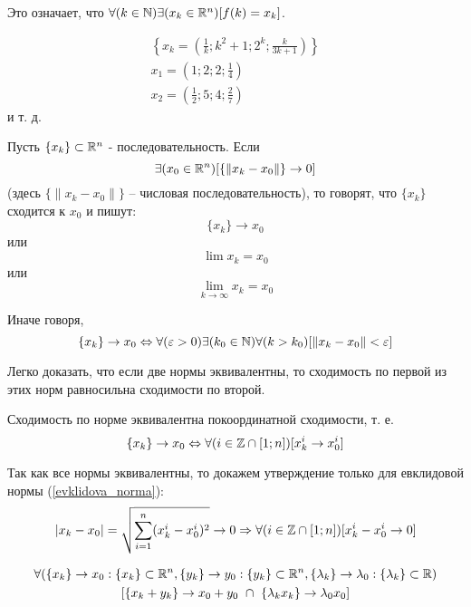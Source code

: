 Это означает, что $\forall(k\in\mathbb{N})\exists(x_k\in\mathbb{R}^n)[f(k)=x_k]$.

\begin{primer}
\begin{multline*}
\left\{x_k=\left( \frac{1}{k};k^2+1;2^k; \frac{k}{3k+1}\right)\right\}
\\
x_1=\left(1;2;2;\frac{1}{4}\right)
\\
x_2=\left(\frac{1}{2};5;4;\frac{2}{7}\right)
\end{multline*}
и т. д.
\end{primer}

\begin{opr}
Пусть $\{x_k\}\subset\mathbb{R}^n$ - последовательность.
Если $$\exists(x_0\in\mathbb{R}^n)[\{\|x_k-x_0\|\}\to0]$$ (здесь $\{\|x_k-x_0\|\}$ -- числовая последовательность), то говорят, что $\{x_k\}$ сходится к $x_0$ и пишут:
$$
\{x_k\}\to x_0
$$
или
$$
\lim x_k =  x_0
$$
или
$$
\lim_{k\to\infty} x_k =  x_0
$$
\end{opr}
Иначе говоря,
\begin{equation*}
\{x_k\}\to x_0 \Leftrightarrow \forall(\varepsilon>0)\exists(k_0\in\mathbb{N})\forall(k>k_0)[\|x_k-x_0\|<\varepsilon]
\end{equation*}

Легко доказать, что если две нормы эквивалентны, то сходимость по первой из этих норм равносильна сходимости по второй.

\begin{teorema}
Сходимость по норме эквивалентна покоординатной сходимости, т. е.
$$
\{x_k\}\to x_0 \Leftrightarrow \forall(i\in\mathbb{Z}\cap[1;n])[x_k^i\to x_0^i]
$$
\end{teorema}
\dokvo
Так как все нормы эквивалентны, то докажем утверждение только для евклидовой нормы (\ref{evklidova_norma}):
$$|x_k-x_0|=\sqrt{\sum_{i=1}^{n}(x_k^i-x_0^i)^2} \to 0
\Rightarrow \forall(i\in\mathbb{Z}\cap[1;n])[x_k^i- x_0^i\to0]
$$
\dokno

\begin{sledstvie}
\begin{multline*}
\forall(\{x_k\}\to x_0:\{x_k\}\subset \mathbb{R}^n,\{y_k\}\to y_0:\{y_k\}\subset \mathbb{R}^n,\{\lambda_k\}\to \lambda_0:\{\lambda_k\}\subset \mathbb{R})
\\
[\{x_k+y_k\}\to x_0+y_0 ~\cap~ \{\lambda_k x_k\}\to \lambda_0 x_0]
\end{multline*}
\end{sledstvie}


